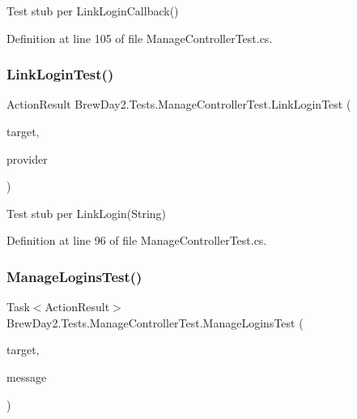 Test stub per Link\+Login\+Callback()



Definition at line 105 of file Manage\+Controller\+Test.\+cs.

\mbox{\label{class_brew_day2_1_1_tests_1_1_manage_controller_test_a0963c0cc77b8761bff78c6bc059b1fe4}} 
\subsubsection{\texorpdfstring{Link\+Login\+Test()}{LinkLoginTest()}}
{\footnotesize\ttfamily Action\+Result Brew\+Day2.\+Tests.\+Manage\+Controller\+Test.\+Link\+Login\+Test (\begin{DoxyParamCaption}\item[{\mbox{[}\+Pex\+Assume\+Under\+Test\mbox{]} \mbox{\hyperlink{class_brew_day2_1_1_controllers_1_1_manage_controller}{Manage\+Controller}}}]{target,  }\item[{string}]{provider }\end{DoxyParamCaption})}



Test stub per Link\+Login(\+String)



Definition at line 96 of file Manage\+Controller\+Test.\+cs.

\mbox{\label{class_brew_day2_1_1_tests_1_1_manage_controller_test_a89af4fcd07b84c3a72d78cd65566e8e0}} 
\subsubsection{\texorpdfstring{Manage\+Logins\+Test()}{ManageLoginsTest()}}
{\footnotesize\ttfamily Task$<$Action\+Result$>$ Brew\+Day2.\+Tests.\+Manage\+Controller\+Test.\+Manage\+Logins\+Test (\begin{DoxyParamCaption}\item[{\mbox{[}\+Pex\+Assume\+Under\+Test\mbox{]} \mbox{\hyperlink{class_brew_day2_1_1_controllers_1_1_manage_controller}{Manage\+Controller}}}]{target,  }\item[{\mbox{\hyperlink{class_brew_day2_1_1_controllers_1_1_manage_controller_a418038dc90e9d94606f474b9c06fd8c8}{Manage\+Controller.\+Manage\+Message\+Id}}?}]{message }\end{DoxyParamCaption})}



